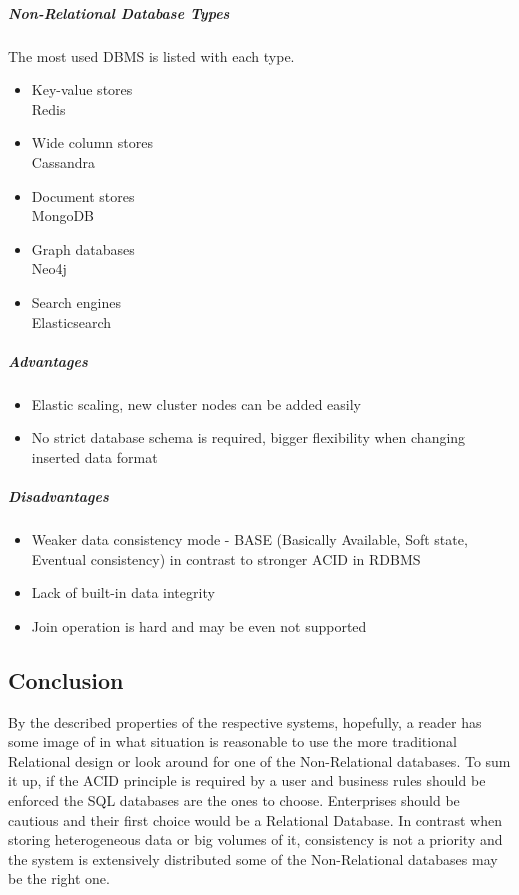 \subparagraph{Non-Relational Database Types}
The most used DBMS is listed with each type.
\begin{itemize}
	\item Key-value stores \cite{KeyValueStores} \\ Redis
	\item Wide column stores \\ Cassandra
	\item Document stores \\ MongoDB
	\item Graph databases \\ Neo4j
	\item Search engines \\ Elasticsearch 
\end{itemize}

\subparagraph{Advantages}
\cite{RelationalVsNonRelationalDatabases1} \cite{RelationalVsNonRelationalDatabases2}

\begin{itemize}
	\item Elastic scaling, new cluster nodes can be added easily
	\item No strict database schema is required, bigger flexibility when changing inserted data format
\end{itemize}

\subparagraph{Disadvantages}

\begin{itemize}
	\item Weaker data consistency mode - BASE (Basically Available, Soft state, Eventual consistency)  in contrast to stronger ACID in RDBMS
	\item Lack of built-in data integrity
	\item Join operation is hard and may be even not supported
\end{itemize}

\subsection{Conclusion}

By the described properties of the respective systems, hopefully, a reader has some image of in what situation is reasonable to use the more traditional Relational design or look around for one of the Non-Relational databases.
To sum it up, if the ACID principle is required by a user and business rules should be enforced the SQL databases are the ones to choose. Enterprises should be cautious and their first choice would be a Relational Database.
In contrast when storing heterogeneous data or big volumes of it, consistency is not a priority and the system is extensively distributed some of the Non-Relational databases may be the right one. \\ 

